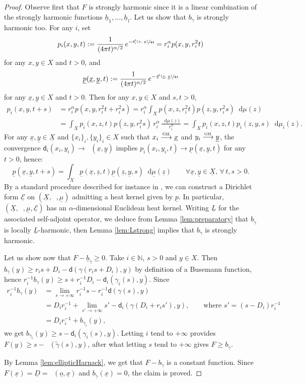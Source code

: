 \documentclass[JEP,XML,SOM,Unicode,published]{cedram}
\def\To#1{\mathchoice{\xrightarrow{\textstyle\kern4pt#1\kern3pt}}{\stackrel{#1}{\longrightarrow}}{}{}}
\newcommand{\sGH}{{\scriptscriptstyle\mathrm{GH}\,}}
\theoremstyle{plain}
\theoremstyle{definition}
\newcommand{\setN}{\mathbb{N}}
\newcommand{\cE}{\mathcal{E}}
\newcommand{\di}{\mathop{}\!\mathrm{d}}
\newcommand{\dist}{\mathsf{d}}
\newcommand{\uX}{\underline{X}}
\DeclareMathOperator{\udist}{\underline{\dist}}
\newcommand{\uo}{\underline{o}}
\newcommand{\ux}{\underline{x}}
\newcommand{\uz}{\underline{z}}
\newcommand{\uD}{\underline{D}}
\newcommand{\umu}{\underline{\mu}}
\newcommand{\uy}{\underline{y}}
\newcommand{\upp}{\underline{p}}
\newcommand{\uh}{\underline{h}}
\begin{document}
\begin{proof}
Observe first that $F$ is strongly harmonic since it is a linear combination of the strongly harmonic functions $\uh_1,\ldots,\uh_l$. Let us show that $b_{\tilde{\gamma}}$ is strongly harmonic too. For any $i$, set
\[
p_i(x,y,t):=\frac{1}{(4\pi t)^{\alpha/2}}\, e^{-\sfrac{\dist_i^2(x,y)}{4t}}= r_i^\alpha p(x,y,r_i^2 t)
\]
for any $x,y \in X$ and $t>0$, and
\[
\underline{p}(\ux,\uy,t):= \frac{1}{(4 \pi t)^{\alpha/2}}\, e^{-\sfrac{\udist^2(\ux,\uy)}{4t}}
\]
for any $\ux,\uy \in X$ and $t>0$. Then for any $x,y \in X$ and $s,t>0$,
\begin{align*}
p_i(x,y,t+s) & = r_i^\alpha p(x,y,r_i^2 t + r_i^2 s) = r_i^\alpha \int_X p(x,z,r_i^2 t)p(z,y,r_i^2 s) \di \mu(z)\\
& = \int_X p_i(x,z,t)p(z,y,r_i^2s) \,r_i^\alpha\, \frac{\di \mu(z)}{r_i^\alpha} = \int_X p_i(x,z,t)p_i(z,y,s) \di \mu_i(z).
\end{align*}
For any $\ux, \uy \in \uX$ and $\{x_i\}_i, \{y_i\}_i \in X$ such that $x_i \To{\sGH} \ux$ and $y_i \To{\sGH} \uy$, the convergence $\dist_i(x_i,y_i) \to \udist(\ux,\uy)$ implies $p_i(x_i,y_i,t) \to \upp(\ux,\uy,t)$ for any $t>0$, hence:
\[
\underline{p}(\ux,\uy,t+s) = \int_X \underline{p}(\ux,\uz,t) \underline{p}(\uz,\uy,s) \di \umu(\uz) \qquad \forall \ux, \uy \in \uX, \, \forall \, t,s>0.
\]
By a standard procedure described for instance in \cite[\S 2]{Grigor'yan}, we can construct a Dirichlet form $\underline{\cE}$ on $(\uX,\udist,\umu)$ admitting a heat kernel given by $\underline{p}$. In particular, $(\uX,\udist,\umu,\underline{\cE})$ has an $\alpha$-dimensional Euclidean heat kernel. Writing $\underline{L}$ for the associated self-adjoint operator, we deduce from Lemma \ref{lem:preparatory} that $b_{\tilde{\gamma}}$ is locally $\underline{L}$-harmonic, then Lemma \ref{lem:Lstrong} implies that $b_{\tilde{\gamma}}$ is strongly harmonic.

Let us show now that $F - \underline{b}_{\tilde{\gamma}} \ge 0$. Take $i\in \setN$, $s>0$ and $y \in X$. Then $b_\gamma(y) \ge r_i s + D_i - \dist(\gamma(r_i s+D_i),y)$ by definition of a Busemann function, hence \hbox{$r_i^{-1}b_\gamma(y) \ge s+ r_i^{-1} D_i - \dist_i(\gamma_i(s),y)$}. Since
\begin{align*}
r_i^{-1}b_\gamma(y) & = \lim_{s \to +\infty} r_i^{-1} s - r_i^{-1} \dist(\gamma(s),y)\\
& = D_i r_i^{-1} + \lim_{s' \to +\infty} s' - \dist_i(\gamma(D_i+r_i s'),y),\qquad \text{where $s'=(s-D_i)r_i^{-1}$}\\ & = D_i r_i^{-1} + b_{\gamma_i}(y),
\end{align*}
we get $b_{\gamma_i}(y) \ge s - \dist_i(\gamma_i(s),y)$. Letting $i$ tend to $+\infty$ provides $F(y)\ge s - \udist(\tilde{\gamma}(s),y)$, after what letting $s$ tend to $+\infty$ gives $F\ge b_{\tilde{\gamma}}$.

By Lemma \ref{lem:ellipticHarnack}, we get that $F-b_{\tilde{\gamma}}$ is a constant function. Since $F(\ux)=\uD=\udist(\uo,\ux) $ and $b_{\tilde{\gamma}}(\ux)=0$, the claim is proved.
\end{proof}
\end{document}
